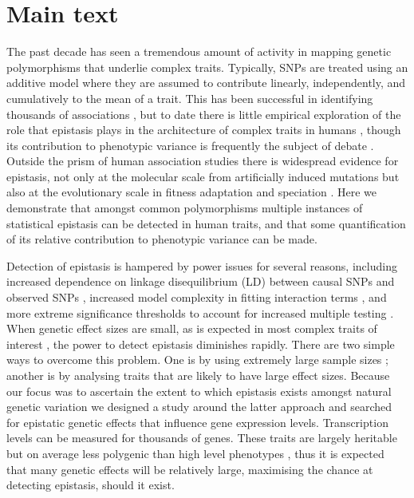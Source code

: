 \documentclass{article}
\begin{document}
\section{Main text}

The past decade has seen a tremendous amount of activity in mapping genetic polymorphisms that underlie complex traits. Typically, SNPs are treated using an additive model where they are assumed to contribute linearly, independently, and cumulatively to the mean of a trait. This has been successful in identifying thousands of associations \cite{Visscher2012}, but to date there is little empirical exploration of the role that epistasis plays in the architecture of complex traits in humans \cite{Strange2010, Evans2011}, though its contribution to phenotypic variance is frequently the subject of debate \cite{Carlborg2004, Hill2008a, Crow2010}. Outside the prism of human association studies there is widespread evidence for epistasis, not only at the molecular scale from artificially induced mutations \cite{Costanzo2010} but also at the evolutionary scale in fitness adaptation \cite{Weinreich2006} and speciation \cite{Breen2012}. Here we demonstrate that amongst common polymorphisms multiple instances of statistical epistasis can be detected in human traits, and that some quantification of its relative contribution to phenotypic variance can be made.

Detection of epistasis is hampered by power issues for several reasons, including increased dependence on linkage disequilibrium (LD) between causal SNPs and observed SNPs \cite{Weir2008, Hemani2013}, increased model complexity in fitting interaction terms \cite{Marchini2005}, and more extreme significance thresholds to account for increased multiple testing \cite{Cordell2009}. When genetic effect sizes are small, as is expected in most complex traits of interest \cite{Visscher2012}, the power to detect epistasis diminishes rapidly. There are two simple ways to overcome this problem. One is by using extremely large sample sizes \cite{LangoAllen2010}; another is by analysing traits that are likely to have large effect sizes. Because our focus was to ascertain the extent to which epistasis exists amongst natural genetic variation we designed a study around the latter approach and searched for epistatic genetic effects that influence gene expression levels. Transcription levels can be measured for thousands of genes. These traits are largely heritable but on average less polygenic than high level phenotypes \cite{Powell2013}, thus it is expected that many genetic effects will be relatively large, maximising the chance at detecting epistasis, should it exist.
\end{document}
